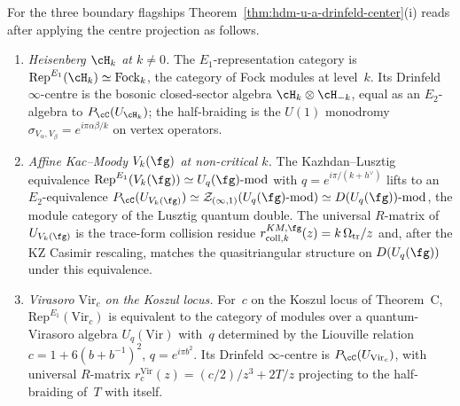 \begin{corollary}
\label{cor:hdm-u-a-drinfeld-center-flagships}
For the three boundary flagships
Theorem~\ref{thm:hdm-u-a-drinfeld-center}\textup{(i)} reads after
applying the centre projection as
follows.
\begin{enumerate}[label=\textup{(F\arabic*)}]
\item \emph{Heisenberg $\cH_k$ at $k\neq 0$.} The
$E_1$-representation category is
$\mathrm{Rep}^{E_1}(\cH_k) \simeq \mathrm{Fock}_k$, the category of
Fock modules at level~$k$. Its Drinfeld $\infty$-centre is the
bosonic closed-sector algebra $\cH_k \otimes \cH_{-k}$, equal as an
$E_2$-algebra to $P_\cC(U_{\cH_k})$; the
half-braiding is the $U(1)$ monodromy
$\sigma_{V_\alpha,V_\beta}= e^{i\pi \alpha\beta / k}$ on vertex operators.
\item \emph{Affine Kac--Moody $V_k(\fg)$ at non-critical $k$.}
The Kazhdan--Lusztig equivalence
$\mathrm{Rep}^{E_1}(V_k(\fg)) \simeq U_q(\fg)\text{-}\mathrm{mod}$
with $q = e^{i\pi/(k+h^\vee)}$ lifts to an $E_2$-equivalence
$P_\cC(U_{V_k(\fg)}) \simeq
\mathcal Z_{(\infty,1)}(U_q(\fg)\text{-}\mathrm{mod})
\simeq D(U_q(\fg))\text{-}\mathrm{mod}$,
the module category of the Lusztig quantum double. The universal
$R$-matrix of~$U_{V_k(\fg)}$ is the trace-form collision residue
$r^{KM,\fg}_{\mathrm{coll},k}(z) = k\,\Omega_{\mathrm{tr}}/z$
and, after the KZ Casimir rescaling, matches the quasitriangular
structure on $D(U_q(\fg))$ under this equivalence.
\item \emph{Virasoro $\mathrm{Vir}_c$ on the Koszul locus.}
For~$c$ on the Koszul locus of Theorem~C,
$\mathrm{Rep}^{E_1}(\mathrm{Vir}_c)$ is equivalent to the category
of modules over a quantum-Virasoro algebra
$U_q(\mathrm{Vir})$ with~$q$ determined by the Liouville relation
$c = 1 + 6(b+b^{-1})^2$, $q = e^{i\pi b^2}$. Its Drinfeld
$\infty$-centre is $P_\cC(U_{\mathrm{Vir}_c})$, with universal
$R$-matrix
$r^{\mathrm{Vir}}_c(z) = (c/2)/z^3 + 2T/z$ projecting to the
half-braiding of~$T$ with itself.
\end{enumerate}
\end{corollary}

